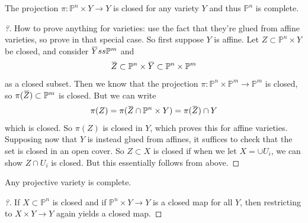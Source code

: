 \begin{corollary}[$\PP^n$ is complete.]

The projection \(\pi: {\mathbb{P}}^n\times Y\to Y\) is closed for any
variety \(Y\) and thus \({\mathbb{P}}^n\) is complete.

\end{corollary}

\begin{proof}[?]

How to prove anything for varieties: use the fact that they're glued
from affine varieties, so prove in that special case. So first suppose
\(Y\) is affine. Let \(Z \subset {\mathbb{P}}^n \times Y\) be closed,
and consider
\(\mkern 1.5mu\overline{\mkern-1.5muY\mkern-1.5mu}\mkern 1.5mu ss {\mathbb{P}}^m\)
and
\begin{align*}
\mkern 1.5mu\overline{\mkern-1.5muZ\mkern-1.5mu}\mkern 1.5mu \subset{\mathbb{P}}^n \times\mkern 1.5mu\overline{\mkern-1.5muY\mkern-1.5mu}\mkern 1.5mu \subset{\mathbb{P}}^n \times{\mathbb{P}}^m
\end{align*}
as a closed subset. Then we know that the projection
\(\pi: {\mathbb{P}}^n \times{\mathbb{P}}^m \to {\mathbb{P}}^m\) is
closed, so
\(\pi(\mkern 1.5mu\overline{\mkern-1.5muZ\mkern-1.5mu}\mkern 1.5mu) \subset{\mathbb{P}}^m\)
is closed. But we can write
\begin{align*}
\pi(Z) = \pi(\mkern 1.5mu\overline{\mkern-1.5muZ\mkern-1.5mu}\mkern 1.5mu \cap{\mathbb{P}}^n \times Y) = \pi(\mkern 1.5mu\overline{\mkern-1.5muZ\mkern-1.5mu}\mkern 1.5mu) \cap Y
\end{align*}
which is closed. So \(\pi(Z)\) is closed in \(Y\), which proves this for
affine varieties.\\

Supposing now that \(Y\) is instead glued from affines, it suffices to
check that the set is closed in an open cover. So \(Z \subset X\) is
closed if when we let \(X = \cup U_i\), we can show \(Z \cap U_i\) is
closed. But this essentially follows from above.

\end{proof}

\begin{corollary}

Any projective variety is complete.

\end{corollary}

\begin{proof}[?]

If \(X \subset {\mathbb{P}}^n\) is closed and if
\({\mathbb{P}}^n \times Y\to Y\) is a closed map for all \(Y\), then
restricting to \(X\times Y\to Y\) again yields a closed map.

\end{proof}

